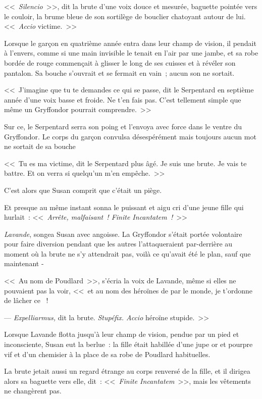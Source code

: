 <<~\emph{Silencio}~>>, dit la brute d'une voix douce et mesurée, baguette pointée vers le couloir, la brume bleue de son sortilège de bouclier chatoyant autour de lui. <<~\emph{Accio} victime.~>>

Lorsque le garçon en quatrième année entra dans leur champ de vision, il pendait à l'envers, comme si une main invisible le tenait en l'air par une jambe, et sa robe bordée de rouge commençait à glisser le long de ses cuisses et à révéler son pantalon. Sa bouche s'ouvrait et se fermait en vain~; aucun son ne sortait.

<<~J'imagine que tu te demandes ce qui se passe, dit le Serpentard en septième année d'une voix basse et froide. Ne t'en fais pas. C'est tellement simple que même un Gryffondor pourrait comprendre.~>>

Sur ce, le Serpentard serra son poing et l'envoya avec force dans le ventre du Gryffondor. Le corps du garçon convulsa désespérément mais toujours aucun mot ne sortait de sa bouche

<<~Tu es ma victime, dit le Serpentard plus âgé. Je suis une brute. Je vais te battre. Et on verra si quelqu'un m'en empêche.~>>

C'est alors que Susan comprit que c'était un piège.

Et presque au même instant sonna le puissant et aigu cri d'une jeune fille qui hurlait~: <<~\emph{Arrête, malfaisant~! Finite Incantatem~!}~>>

\emph{Lavande}, songea Susan avec angoisse. La Gryffondor s'était portée volontaire pour faire diversion pendant que les autres l'attaqueraient par-derrière au moment où la brute ne s'y attendrait pas, voilà ce qu'avait été le plan, sauf que maintenant -

<<~Au nom de Poudlard~>>, s'écria la voix de Lavande, même si elles ne pouvaient pas la voir, <<~et au nom des héroïnes de par le monde, je t'ordonne de lâcher ce ~!

--- \emph{Expelliarmus,} dit la brute. \emph{Stupéfix. Accio} héroïne stupide.~>>

Lorsque Lavande flotta jusqu'à leur champ de vision, pendue par un pied et inconsciente, Susan eut la berlue~: la fille était habillée d'une jupe or et pourpre vif et d'un chemisier à la place de sa robe de Poudlard habituelles.

La brute jetait aussi un regard étrange au corps renversé de la fille, et il dirigea alors sa baguette vers elle, dit~: <<~\emph{Finite Incantatem}~>>, mais les vêtements ne changèrent pas.

